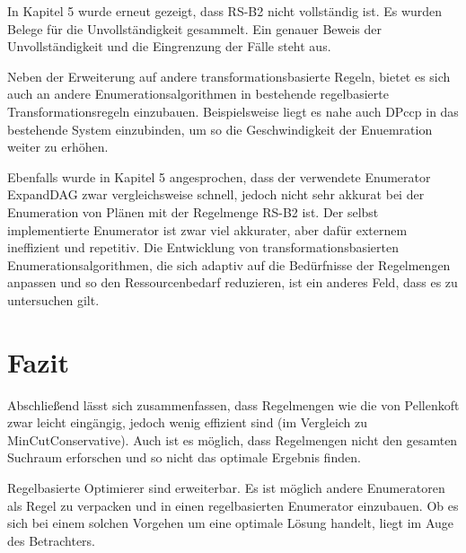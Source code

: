 In Kapitel 5 wurde erneut gezeigt, dass RS-B2 nicht vollständig ist. Es wurden Belege für die Unvollständigkeit gesammelt. Ein genauer Beweis der Unvollständigkeit und die Eingrenzung der Fälle steht aus.

Neben der Erweiterung auf andere transformationsbasierte Regeln, bietet es sich auch an andere Enumerationsalgorithmen in bestehende regelbasierte Transformationsregeln einzubauen. Beispielsweise liegt es nahe auch DPccp in das bestehende System einzubinden, um so die Geschwindigkeit der Enuemration weiter zu erhöhen.

Ebenfalls wurde in Kapitel 5 angesprochen, dass der verwendete Enumerator ExpandDAG zwar vergleichsweise schnell, jedoch nicht sehr akkurat bei der Enumeration von Plänen mit der Regelmenge RS-B2 ist. Der selbst implementierte Enumerator ist zwar viel akkurater, aber dafür externem ineffizient und repetitiv. Die Entwicklung von transformationsbasierten Enumerationsalgorithmen, die sich adaptiv auf die Bedürfnisse der Regelmengen anpassen und so den Ressourcenbedarf reduzieren, ist ein anderes Feld, dass es zu untersuchen gilt.  



\section{Fazit}

Abschließend lässt sich zusammenfassen, dass Regelmengen wie die von Pellenkoft zwar leicht eingängig, jedoch wenig effizient sind (im Vergleich zu MinCutConservative). Auch ist es möglich, dass Regelmengen nicht den gesamten Suchraum erforschen und so nicht das optimale Ergebnis finden. 

Regelbasierte Optimierer sind erweiterbar. Es ist möglich andere Enumeratoren als Regel zu verpacken und in einen regelbasierten Enumerator einzubauen. Ob es sich bei einem solchen Vorgehen um eine optimale Lösung handelt, liegt im Auge des Betrachters.





